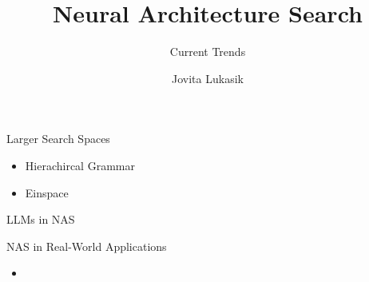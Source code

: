 \documentclass[main]{subfiles}
\title[AutoML: NAS]{Neural Architecture Search}
\subtitle{Current Trends}
\author[Jovita Lukasik]{Jovita Lukasik}
\date{}
\begin{document}
	\maketitle

\begin{frame}{Larger Search Spaces}
    \begin{itemize}
        \item Hierachircal Grammar
        \item Einspace
    \end{itemize}
\end{frame}

\begin{frame}{LLMs in NAS}

\end{frame}

\begin{frame}{NAS in Real-World Applications}
    \begin{itemize}
        \item 
    \end{itemize}
\end{frame}
\end{document}
